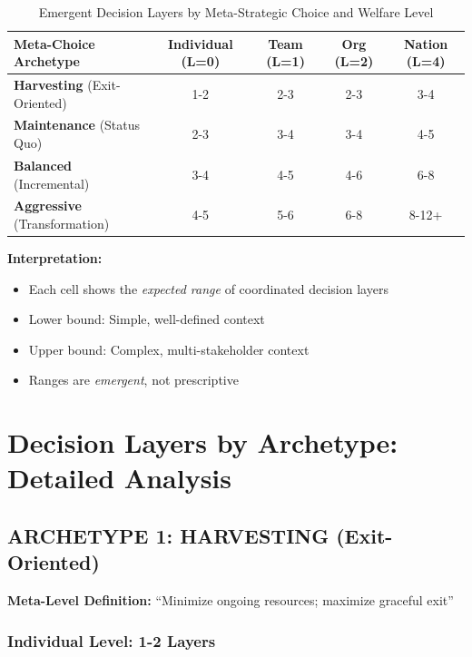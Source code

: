 \documentclass[11pt, a4paper]{article}
\begin{document}
\begin{table}[htbp]
\centering
\caption{Emergent Decision Layers by Meta-Strategic Choice and Welfare Level}
\small
\renewcommand{\arraystretch}{1.4}
\begin{tabularx}{\textwidth}{|l|c|c|c|c|}
\hline
\textbf{Meta-Choice Archetype} & \textbf{Individual (L=0)} & \textbf{Team (L=1)} & \textbf{Org (L=2)} & \textbf{Nation (L=4)} \\
\hline
\cellcolor{red!20}\textbf{Harvesting} (Exit-Oriented) & 1-2 & 2-3 & 2-3 & 3-4 \\
\hline
\cellcolor{yellow!20}\textbf{Maintenance} (Status Quo) & 2-3 & 3-4 & 3-4 & 4-5 \\
\hline
\cellcolor{green!20}\textbf{Balanced} (Incremental) & 3-4 & 4-5 & 4-6 & 6-8 \\
\hline
\cellcolor{blue!20}\textbf{Aggressive} (Transformation) & 4-5 & 5-6 & 6-8 & 8-12+ \\
\hline
\end{tabularx}
\end{table}

\textbf{Interpretation:}
\begin{itemize}[nosep]
    \item Each cell shows the \textit{expected range} of coordinated decision layers
    \item Lower bound: Simple, well-defined context
    \item Upper bound: Complex, multi-stakeholder context
    \item Ranges are \textit{emergent}, not prescriptive
\end{itemize}

\section{Decision Layers by Archetype: Detailed Analysis}

\subsection{ARCHETYPE 1: HARVESTING (Exit-Oriented)}

\textbf{Meta-Level Definition:} ``Minimize ongoing resources; maximize graceful exit''

\subsubsection{Individual Level: 1-2 Layers}
\end{document}
